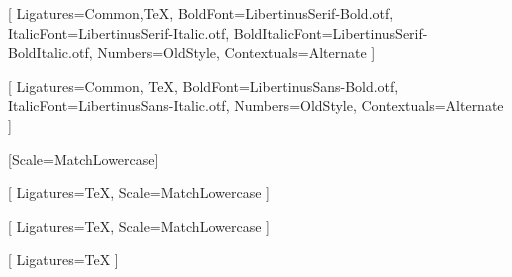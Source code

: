 %



\setmainfont{LibertinusSerif-Regular.otf}[
    Ligatures={Common,TeX},
    BoldFont=LibertinusSerif-Bold.otf,
    ItalicFont=LibertinusSerif-Italic.otf,
    BoldItalicFont=LibertinusSerif-BoldItalic.otf,
    Numbers={OldStyle},
    Contextuals={Alternate}
]

\setsansfont{LibertinusSans-Regular.otf}[
    Ligatures={Common, TeX},
    BoldFont=LibertinusSans-Bold.otf,
    ItalicFont=LibertinusSans-Italic.otf,
    Numbers={OldStyle},
    Contextuals={Alternate}
]

\setmonofont{Iosevka}[Scale=MatchLowercase]

[
    Ligatures=TeX,
    Scale=MatchLowercase
]

\setmathfontface{}[
    Ligatures=TeX,
    Scale=MatchLowercase
]
\setoperatorfont\mathoper

\newfontface{}[
    Ligatures=TeX
]
